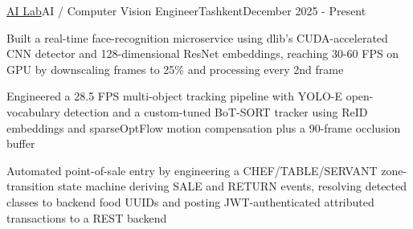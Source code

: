  \begin{resume_employer}{\href{https://www.linkedin.com/company/ai-lab-centralasian}{AI Lab}}{AI / Computer Vision
  Engineer}{Tashkent}{December 2025 - Present}
      \item Built a real-time face-recognition microservice using dlib's CUDA-accelerated CNN detector and 128-dimensional ResNet embeddings, reaching
  30-60 FPS on GPU by downscaling frames to 25\% and processing every 2nd frame
      \item Engineered a 28.5 FPS multi-object tracking pipeline with YOLO-E open-vocabulary detection and a custom-tuned BoT-SORT tracker using ReID
  embeddings and sparseOptFlow motion compensation plus a 90-frame occlusion buffer
      \item Automated point-of-sale entry by engineering a CHEF/TABLE/SERVANT zone-transition state machine deriving SALE and RETURN events, resolving
  detected classes to backend food UUIDs and posting JWT-authenticated attributed transactions to a REST backend
   \end{resume_employer}
